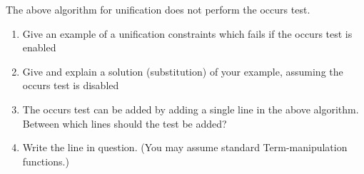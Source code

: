 \documentclass{article}
\newcommand{\answer}[1]{}
\begin{document}
The above algorithm for unification does not perform the occurs test.

\begin{enumerate}
\item Give an example of a unification constraints which fails if the
  occurs test is enabled 
\item Give and explain a solution (substitution) of your example,
  assuming the occurs test is disabled 
\item The occurs test can be added by adding a single line in the
  above algorithm. Between which lines should the test be added?
\item Write the line in question. (You may assume standard
  Term-manipulation functions.) 
\end{enumerate}

\answer{
  \begin{enumerate}
  \item Cons 0 x == x
  \item Cons 0 (Cons 0 ...)
  \item 6/7
  \item 
    \begin{verbatim}
      unify ((Var x,t):ts) s | x `occursIn` t = Nothing
    \end{verbatim}
  \end{enumerate}
}
\end{document}
